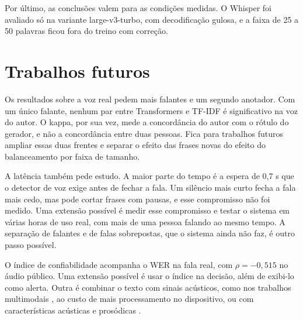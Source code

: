 \documentclass[
    12pt,                %
    openright,           %
    oneside,             %
    a4paper,             %
    english,             %
    brazil               %
]{abntex2}
\begin{document}
Por último, as conclusões valem para as condições medidas. O Whisper foi avaliado só na variante large-v3-turbo, com decodificação gulosa, e a faixa de 25 a 50 palavras ficou fora do treino com correção. 


\section{Trabalhos futuros}

Os resultados sobre a voz real pedem mais falantes e um segundo anotador. Com um único falante, nenhum par entre Transformers e TF-IDF é significativo na voz do autor. O kappa, por sua vez, mede a concordância do autor com o rótulo do gerador, e não a concordância entre duas pessoas. Fica para trabalhos futuros ampliar essas duas frentes e separar o efeito das frases novas do efeito do balanceamento por faixa de tamanho.

A latência também pede estudo. A maior parte do tempo é a espera de 0,7 s que o detector de voz exige antes de fechar a fala. Um silêncio mais curto fecha a fala mais cedo, mas pode cortar frases com pausas, e esse compromisso não foi medido. Uma extensão possível é medir esse compromisso e testar o sistema em várias horas de uso real, com mais de uma pessoa falando ao mesmo tempo. A separação de falantes e de falas sobrepostas, que o sistema ainda não faz, é outro passo possível.

O índice de confiabilidade acompanha o WER na fala real, com $\rho = -0{,}515$ no áudio público. Uma extensão possível é usar o índice na decisão, além de exibi-lo como alerta. Outra é combinar o texto com sinais acústicos, como nos trabalhos multimodais \cite{Mallidi2018, Wagner2024}, ao custo de mais processamento no dispositivo, ou com características acústicas e prosódicas \cite{Norouzian2019, Krishna2024}.

\postextual



%
%
%
\end{document}
